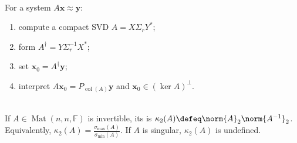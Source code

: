 \begin{method} \label{meth:pseudoinverse-solution-method} \\
For a system $A\mathbf{x}\approx\mathbf{y}$:
\begin{enumerate}[label=(\roman*)]
\setlength{\itemsep}{0pt}
\item compute a compact SVD $A=X\Sigma_rY^*$;
\item form $A^{\dagger}=Y\Sigma_r^{-1}X^*$;
\item set $\mathbf{x}_0=A^{\dagger}\mathbf{y}$;
\item interpret $A\mathbf{x}_0=P_{\operatorname{col}(A)}\mathbf{y}$ and $\mathbf{x}_0\in(\ker A)^{\perp}$.
\end{enumerate}
\end{method}

\begin{definition} \label{def:spectral-condition-number} \\
If $A\in\operatorname{Mat}(n,n,\mathbb{F})$ is invertible, its  is $\kappa_2(A)\defeq\norm{A}_2\norm{A^{-1}}_2$.\\
Equivalently, $\kappa_2(A)=\frac{\sigma_{\max}(A)}{\sigma_{\min}(A)}$. If $A$ is singular, $\kappa_2(A)$ is undefined.
\end{definition}

